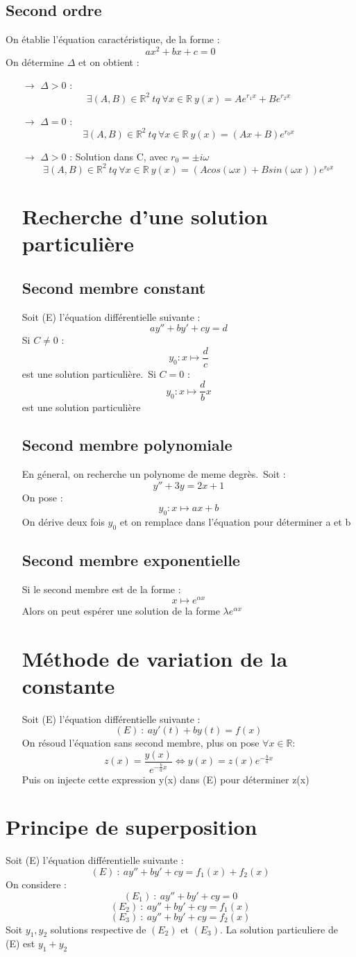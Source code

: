 \subsection{Second ordre}
On établie l'équation caractéristique, de la forme :
$$ax^2+bx+c = 0$$
On détermine $\Delta$ et on obtient :
\begin{itemize}
 \item[$\rightarrow$] $\Delta > 0$ : $$\exists(A,B)\in \mathbb{R}^2~ tq~ \forall x \in \mathbb{R}~ y(x) = Ae^{r_1x}+Be^{r_2x}$$
 \item[$\rightarrow$] $\Delta = 0$ : $$\exists(A,B)\in \mathbb{R}^2~ tq~ \forall x \in \mathbb{R}~ y(x) = (Ax+B)e^{r_0x}$$
 \item[$\rightarrow$] $\Delta > 0$ : Solution dans C, avec $r_0 = \pm i\omega$ $$\exists(A,B)\in \mathbb{R}^2~ tq~ \forall x \in \mathbb{R}~ y(x) = (Acos(\omega x)+Bsin(\omega x))e^{r_0x}$$ 
\section{Recherche d'une solution particulière}
\subsection{Second membre constant}
Soit (E) l'équation différentielle suivante :
$$ay''+by'+cy=d$$
Si $C \neq 0$ :\
$$y_0 : x \mapsto \dfrac{d}{c}$$
est une solution particulière.\
Si $C = 0$ :\
$$y_0 : x \mapsto \dfrac{d}{b}x$$
est une solution particulière
\subsection{Second membre polynomiale}
En géneral, on recherche un polynome de meme degrès.\
Soit :
$$y''+3y = 2x+1$$
On pose : 
$$y_0 : x \mapsto ax+b$$
On dérive deux fois $y_0$ et on remplace dans l'équation pour déterminer a et b
\subsection{Second membre exponentielle}
Si le second membre est de la forme :
$$x \mapsto e^{\alpha x}$$
Alors on peut espérer une solution de la forme $\lambda e^{\alpha x}$
\section{Méthode de variation de la constante}
Soit (E) l'équation différentielle suivante : 
$$(E)~ :~ ay'(t)+by(t) = f(x)$$
On résoud l'équation sans second membre, plus on pose $\forall x \in \mathbb{R}$:
$$z(x) = \dfrac{y(x)}{e^{-\frac{b}{a}x}} \Leftrightarrow y(x) = z(x)e^{-\frac{b}{a}x}$$
Puis on injecte cette expression y(x) dans (E) pour déterminer z(x)
\end{itemize}
\section{Principe de superposition}
Soit (E) l'équation différentielle suivante :
$$(E)~ :~ ay''+by'+cy = f_1(x) + f_2(x)$$
On considere :
$$(E_1)~ :~ ay''+by'+cy = 0$$
$$(E_2)~ :~ ay''+by'+cy = f_1(x)$$
$$(E_3)~ :~ ay''+by'+cy = f_2(x)$$
Soit $y_1,y_2$ solutions respective de $(E_2)$ et $(E_3)$. La solution particuliere de (E) est $y_1+y_2$
